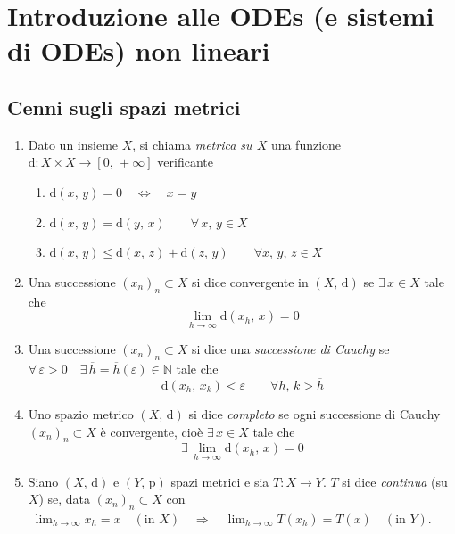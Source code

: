 \graphicspath{{04_ODEs/figures/PNG/}{04_ODEs/figures/PDF/}{04_ODEs/figures/}}


\chapter{Introduzione alle ODEs (e sistemi di ODEs) non lineari}
\copyrightnotice
\section{Cenni sugli spazi metrici}
\begin{definition}
\mbox{}
\begin{enumerate}[labelindent=\parindent,leftmargin=*,label=\textnormal{(\roman*)},start=1]
\item Dato un insieme $X$, si chiama \emph{metrica su $X$} una funzione $\mathrm{d} : X \times X \longrightarrow [0,\,+\infty]$ verificante
	\begin{enumerate}[labelindent=\parindent,leftmargin=*,label=\textnormal{(d\arabic*)},start=1]
	\item $\mathrm{d}(x,\,y) = 0 \quad\Longleftrightarrow\quad x=y$
	\item $\mathrm{d}(x,\,y) = \mathrm{d}(y,\,x) \qquad \forall \, x,\,y \in X$
	\item $\mathrm{d}(x,\,y) \leq \mathrm{d}(x,\,z) + \mathrm{d}(z,\,y) \qquad \forall x,\,y,\,z \in X$
	\end{enumerate}
\item Una successione $(x_n)_n \subset X$ si dice convergente in $(X,\,\mathrm{d})$ se $\exists \, x \in X$ tale che
$$
\lim_{h \rightarrow \infty} \mathrm{d}(x_h,\,x) = 0
$$
\item Una successione $(x_n)_n \subset X$ si dice una \emph{successione di Cauchy} se $\forall \, \varepsilon > 0 \quad \exists \, \overline{h} = \overline{h}(\varepsilon) \in \mathbb{N}$ tale che
$$
\mathrm{d}(x_h,\,x_k) < \varepsilon \qquad \forall h,\,k > \overline{h}
$$
\item Uno spazio metrico $(X,\,\mathrm{d})$ si dice \emph{completo} se ogni successione di Cauchy $(x_n)_n \subset X$ è convergente, cioè $\exists \, x \in X$ tale che
$$
\exists \, \lim_{h \rightarrow \infty} \mathrm{d}(x_h,\,x) = 0
$$
\item Siano $(X,\,\mathrm{d})$ e $(Y,\,\mathrm{p})$ spazi metrici e sia $T : X \longrightarrow Y$. $T$ si dice \emph{continua} (su $X$) se, data $(x_n)_n \subset X$ con $\; \displaystyle \lim_{h \rightarrow \infty} x_h = x \quad (\text{in } X) \quad\Longrightarrow\quad \lim_{h \rightarrow \infty} T(x_h) = T(x) \quad (\text{in } Y)$.
\end{enumerate}
\end{definition}


